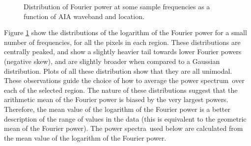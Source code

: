 \documentclass[onecolumn]{emulateapj}
\newcommand{\PS}{power spectrum}
\newcommand{\PA}{power spectra}
\begin{document}
\begin{figure}
\centerline{
}
\centerline{
}
\centerline{
}
\centerline{
}
\caption{Distribution of Fourier power at some sample frequencies as a
function of AIA waveband and location.}
\label{fig:dist171193}
\end{figure}
Figure \ref{fig:dist171193} show the distributions of the logarithm of
the Fourier power for a small number of frequencies, for all the
pixels in each region.  These distributions are centrally peaked, and
show a slightly heavier tail towards lower Fourier powers (negative
skew), and are slightly broader when compared to a Gaussian
distribution.  Plots of all these distribution show that they are all
unimodal.  These observations guide the choice of how to average the
\PS\ over each of the selected region.  The nature of these
distributions suggest that the arithmetic mean of the Fourier power is
biased by the very largest powers.  Therefore, the mean value of the
logarithm of the Fourier power is a better description of the range of
values in the data (this is equivalent to the geometric mean of the
Fourier power).  The \PA\ used below are calculated from the mean
value of the logarithm of the Fourier power.
\end{document}
